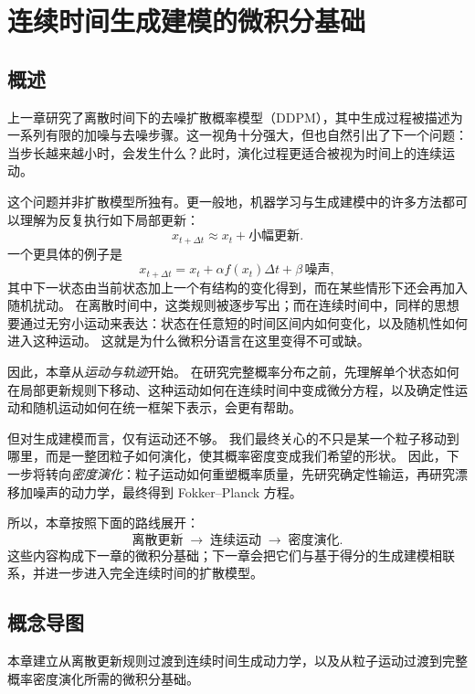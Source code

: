 \chapter{连续时间生成建模的微积分基础}

\section*{概述}

上一章研究了离散时间下的去噪扩散概率模型（DDPM），其中生成过程被描述为一系列有限的加噪与去噪步骤。这一视角十分强大，但也自然引出了下一个问题：当步长越来越小时，会发生什么？此时，演化过程更适合被视为时间上的连续运动。

这个问题并非扩散模型所独有。更一般地，机器学习与生成建模中的许多方法都可以理解为反复执行如下局部更新：
\[
x_{t+\Delta t}\approx x_t+\text{小幅更新}.
\]
一个更具体的例子是
\[
x_{t+\Delta t}=x_t+\alpha f(x_t)\Delta t+\beta\,\text{噪声},
\]
其中下一状态由当前状态加上一个有结构的变化得到，而在某些情形下还会再加入随机扰动。
在离散时间中，这类规则被逐步写出；而在连续时间中，同样的思想要通过无穷小运动来表达：状态在任意短的时间区间内如何变化，以及随机性如何进入这种运动。
这就是为什么微积分语言在这里变得不可或缺。

因此，本章从\emph{运动与轨迹}开始。
在研究完整概率分布之前，先理解单个状态如何在局部更新规则下移动、这种运动如何在连续时间中变成微分方程，以及确定性运动和随机运动如何在统一框架下表示，会更有帮助。

但对生成建模而言，仅有运动还不够。
我们最终关心的不只是某一个粒子移动到哪里，而是一整团粒子如何演化，使其概率密度变成我们希望的形状。
因此，下一步将转向\emph{密度演化}：粒子运动如何重塑概率质量，先研究确定性输运，再研究漂移加噪声的动力学，最终得到 Fokker--Planck 方程。

所以，本章按照下面的路线展开：
\[
\text{离散更新}
\;\longrightarrow\;
\text{连续运动}
\;\longrightarrow\;
\text{密度演化}.
\]
这些内容构成下一章的微积分基础；下一章会把它们与基于得分的生成建模相联系，并进一步进入完全连续时间的扩散模型。

\section*{概念导图}

本章建立从离散更新规则过渡到连续时间生成动力学，以及从粒子运动过渡到完整概率密度演化所需的微积分基础。

